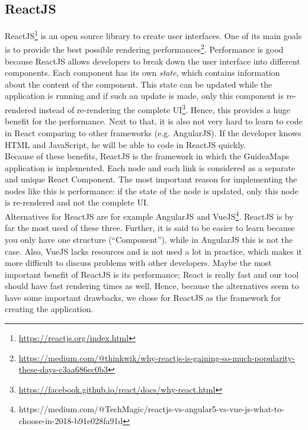 \subsection{ReactJS}\label{sec:reactjs}
ReactJS\footnote{\url{https://reactjs.org/index.html}} is an open source library to create user interfaces. One of its main goals is to provide the best possible rendering performances\footnote{\url{https://medium.com/@thinkwik/why-reactjs-is-gaining-so-much-popularity-these-days-c3aa686ec0b3}}. Performance is good because ReactJS allows developers to break down the user interface into different components. Each component has its own \textit{state}, which contains information about the content of the component. This state can be updated while the application is running and if such an update is made, only this component is re-rendered instead of re-rendering the complete UI\footnote{\url{https://facebook.github.io/react/docs/why-react.html}}. Hence, this provides a huge benefit for the performance. Next to that, it is also not very hard to learn to code in React comparing to other frameworks (e.g. AngularJS). If the developer knows HTML and JavaScript, he will be able to code in ReactJS quickly.\\

Because of these benefits, ReactJS is the framework in which the GuideaMaps application is implemented. Each node and each link is considered as a separate and unique React Component. The most important reason for implementing the nodes like this is performance: if the state of the node is updated, only this node is re-rendered and not the complete UI.\\

Alternatives for ReactJS are for example AngularJS and VueJS\footnote{https://medium.com/@TechMagic/reactjs-vs-angular5-vs-vue-js-what-to-choose-in-2018-b91e028fa91d}. ReactJS is by far the most used of these three. Further, it is said to be easier to learn because you only have one structure (``Component''), while in AngularJS this is not the case. Also, VueJS lacks resources and is not used a lot in practice, which makes it more difficult to discuss problems with other developers. Maybe the most important benefit of ReactJS is its performance; React is really fast and our tool should have fast rendering times as well. Hence, because the alternatives seem to have some important drawbacks, we chose for ReactJS as the framework for creating the application. 

